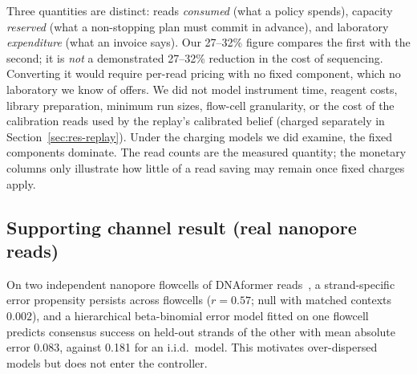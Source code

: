 \documentclass[conference,onecolumn,11pt]{IEEEtran}
\begin{document}
Three quantities are distinct: reads \emph{consumed} (what a policy spends), capacity \emph{reserved}
(what a non-stopping plan must commit in advance), and laboratory \emph{expenditure} (what an invoice
says).  Our 27--32\% figure compares the first with the second; it is \emph{not} a demonstrated
27--32\% reduction in the cost of sequencing.  Converting it would require per-read pricing with no
fixed component, which no laboratory we know of offers.  We did not model instrument time, reagent
costs, library preparation, minimum run sizes, flow-cell granularity, or the cost of the calibration
reads used by the replay's calibrated belief (charged separately in Section~\ref{sec:res-replay}).
Under the charging models we did examine, the fixed components dominate.  The read counts are the
measured quantity; the monetary columns only illustrate how little of a read saving may remain once
fixed charges apply.

\subsection{Supporting channel result (real nanopore reads)}
On two independent nanopore flowcells of DNAformer reads~\cite{barlev2025deep,technion2025dnaformerreads},
a strand-specific error propensity persists across flowcells ($r{=}0.57$; null with matched
contexts $0.002$), and a hierarchical beta-binomial error model fitted on one flowcell predicts
consensus success on held-out strands of the other with mean absolute error 0.083, against 0.181
for an i.i.d.\ model.  This motivates over-dispersed models but does not enter the controller.

\end{document}
